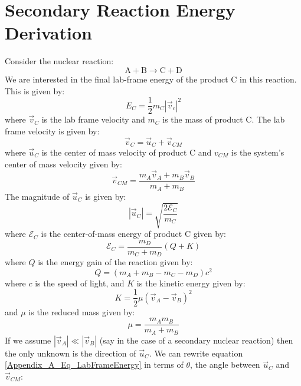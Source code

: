 \chapter{Secondary Reaction Energy Derivation}
\label{Secondary Reaction Energy}

	Consider the nuclear reaction:
	\begin{equation}
		\text{A} + \text{B} \rightarrow \text{C} + \text{D}
	\end{equation}
	We are interested in the final lab-frame energy of the product C in this reaction. This is given by:
	\begin{equation}
		E_C = \frac{1}{2} m_C |\vec{v}_c|^2
		\label{Appendix_A_Eq_LabFrameEnergy}
	\end{equation}
	where $\vec{v}_C$ is the lab frame velocity and $m_C$ is the mass of product C. The lab frame velocity is given by:
	\begin{equation}
		\vec{v}_C = \vec{u}_C + \vec{v}_{CM}
	\end{equation}
	where $\vec{u}_C$ is the center of mass velocity of product C and $v_{CM}$ is the system's center of mass velocity given by:
	\begin{equation}
		\vec{v}_{CM} = \frac{m_A\vec{v}_A + m_B\vec{v}_B}{m_A + m_B}
	\end{equation}
	The magnitude of $\vec{u}_C$ is given by:
	\begin{equation}
		|\vec{u}_C| = \sqrt{\frac{2\mathcal{E}_C}{m_C}}
	\end{equation}
	where $\mathcal{E}_C$ is the center-of-mass energy of product C given by:
	\begin{equation}
		\mathcal{E}_C = \frac{m_D}{m_C+m_D} \left(Q + K\right)
	\end{equation}
	where $Q$ is the energy gain of the reaction given by:
	\begin{equation}
		Q = \left(m_A + m_B - m_C - m_D\right)c^2
	\end{equation}
	where $c$ is the speed of light, and $K$ is the kinetic energy given by:
	\begin{equation}
		K = \frac{1}{2}\mu \left(\vec{v}_A - \vec{v}_B\right)^2
	\end{equation}
	and $\mu$ is the reduced mass given by:
	\begin{equation}
		\mu = \frac{m_A m_B}{m_A + m_B}
	\end{equation}
	If we assume $|\vec{v}_A| \ll |\vec{v}_B|$ (say in the case of a secondary nuclear reaction) then the only unknown is the direction of $\vec{u}_C$. We can rewrite equation \ref{Appendix_A_Eq_LabFrameEnergy} in terms of $\theta$, the angle between $\vec{u}_C$ and $\vec{v}_{CM}$:
	
